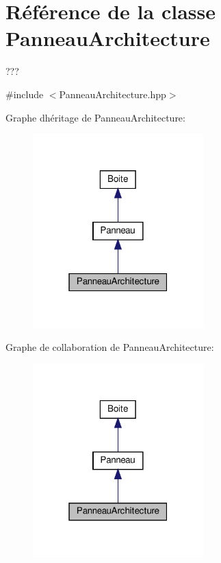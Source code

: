 \hypertarget{classPanneauArchitecture}{}\section{Référence de la classe Panneau\+Architecture}
\label{classPanneauArchitecture}


???  




{\ttfamily \#include $<$Panneau\+Architecture.\+hpp$>$}



Graphe d\textquotesingle{}héritage de Panneau\+Architecture\+:
\nopagebreak
\begin{figure}[H]
\begin{center}
\leavevmode
\includegraphics[width=187pt]{classPanneauArchitecture__inherit__graph}
\end{center}
\end{figure}


Graphe de collaboration de Panneau\+Architecture\+:
\nopagebreak
\begin{figure}[H]
\begin{center}
\leavevmode
\includegraphics[width=187pt]{classPanneauArchitecture__coll__graph}
\end{center}
\end{figure}
